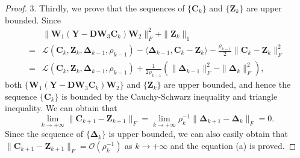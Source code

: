 \begin{proof}
3. Thirdly, we prove that the sequences of 
$\{\bm{C}_{k}\}$ and $\{\bm{Z}_{k}\}$ are upper bounded. Since 
\begin{align}
&\|\bm{W}_{1}(\bm{Y}-\bm{D}\bm{W}_{3}\bm{C}_{k})\bm{W}_{2}\|_{F}^{2}
+
\|\bm{Z}_{k}\|_{1}
\\
=
&
\mathcal{L}(\bm{C}_{k},\bm{Z}_{k},\bm{\Delta}_{k-1},\rho_{k-1})
-
\langle
\bm{\Delta}_{k-1},
\bm{C}_{k}-\bm{Z}_{k}
\rangle
-
\frac{\rho_{k-1}}{2}
\|
\bm{C}_{k}-\bm{Z}_{k}
\|_{F}^{2}
\\
=
&
\mathcal{L}(\bm{C}_{k},\bm{Z}_{k},\bm{\Delta}_{k-1},\rho_{k-1})
+
\frac{1}{2\rho_{k-1}}
(
\|
\bm{\Delta}_{k-1}
\|_{F}^{2}
-
\|
\bm{\Delta}_{k}
\|_{F}^{2}
)
,
\end{align}
both $\{\bm{W}_{1}(\bm{Y}-\bm{D}\bm{W}_{3}\bm{C}_{k})\bm{W}_{2}\}$ and $\{\bm{Z}_{k}\}$ are upper bounded, and hence
the sequence $\{\bm{C}_{k}\}$ is bounded by the Cauchy-Schwarz inequality and triangle inequality.
We can obtain that 
\begin{equation}
\label{equa8-54}
\lim_{k \to +\infty} 
\|\bm{C}_{k+1}-\bm{Z}_{k+1}\|_{F}
=
\lim_{k \to +\infty} 
\rho_{k}^{-1}
\|
\bm{\Delta}_{k+1}
-
\bm{\Delta}_{k}
\|_{F}
=
0.
\end{equation}
Since the sequence of $\{\bm{\Delta}_{k}\}$ is upper bounded, we can also easily obtain that
$\|\bm{C}_{k+1}-\bm{Z}_{k+1}\|_{F}=\mathcal{O}(\rho_{k}^{-1})$ 
as 
$k \to +\infty$
and the equation (a) is proved.


\end{proof}
